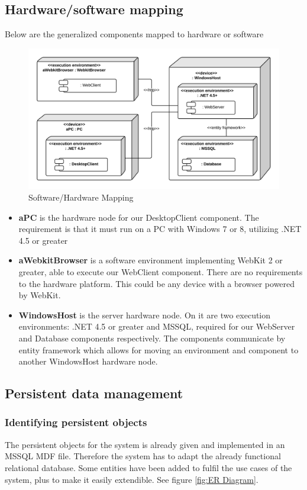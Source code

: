 \subsection{Hardware/software mapping}
\label{sec:Hardware/software mapping}
Below are the generalized components mapped to hardware or software
\begin{figure}[H]
\includegraphics[scale=0.2]{img/SDD/SoftwareHardwareMapping.png}
\caption{Software/Hardware Mapping}
\label{fig:SoftwareHardwareMapping}
\end{figure}

\begin{itemize}
\item \textbf{aPC} is the hardware node for our DesktopClient component. The requirement is that it must run on a PC with Windows 7 or 8, utilizing .NET 4.5 or greater
\item \textbf{aWebkitBrowser} is a software environment implementing WebKit 2 or greater, able to execute our WebClient component. There are no requirements to the hardware platform. This could be any device with a browser powered by WebKit.
\item \textbf{WindowsHost} is the server hardware node. On it are two execution environments: .NET 4.5 or greater and MSSQL, required for our WebServer and Database components respectively. The components communicate by entity framework which allows for moving an environment and component to another WindowsHost hardware node.
\end{itemize}

\subsection{Persistent data management}
\subsubsection{Identifying persistent objects}
The persistent objects for the system is already given and implemented in an MSSQL MDF file. Therefore the system has to adapt the already functional relational database. Some entities have been added to fulfil the use cases of the system, plus to make it easily extendible. See figure \ref{fig:ER Diagram}.

